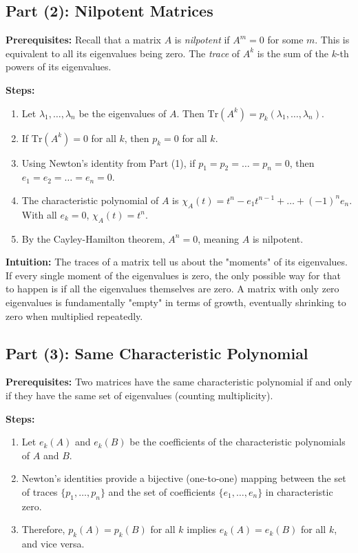 \begin{solution}
\subsection*{Part (2): Nilpotent Matrices}

\textbf{Prerequisites:} 
Recall that a matrix $A$ is \textit{nilpotent} if $A^m = 0$ for some $m$. This is equivalent to all its eigenvalues being zero. The \textit{trace} of $A^k$ is the sum of the $k$-th powers of its eigenvalues.

\textbf{Steps:}
\begin{enumerate}
    \item Let $\lambda_1, \dots, \lambda_n$ be the eigenvalues of $A$. Then $\mathrm{Tr}(A^k) = p_k(\lambda_1, \dots, \lambda_n)$.
    \item If $\mathrm{Tr}(A^k) = 0$ for all $k$, then $p_k = 0$ for all $k$.
    \item Using Newton's identity from Part (1), if $p_1 = p_2 = \dots = p_n = 0$, then $e_1 = e_2 = \dots = e_n = 0$.
    \item The characteristic polynomial of $A$ is $\chi_A(t) = t^n - e_1 t^{n-1} + \dots + (-1)^n e_n$. With all $e_k = 0$, $\chi_A(t) = t^n$.
    \item By the Cayley-Hamilton theorem, $A^n = 0$, meaning $A$ is nilpotent.
\end{enumerate}

\textbf{Intuition:}
The traces of a matrix tell us about the "moments" of its eigenvalues. If every single moment of the eigenvalues is zero, the only possible way for that to happen is if all the eigenvalues themselves are zero. A matrix with only zero eigenvalues is fundamentally "empty" in terms of growth, eventually shrinking to zero when multiplied repeatedly.

\par\vspace{1.5em}

\subsection*{Part (3): Same Characteristic Polynomial}

\textbf{Prerequisites:} 
Two matrices have the same characteristic polynomial if and only if they have the same set of eigenvalues (counting multiplicity).

\textbf{Steps:}
\begin{enumerate}
    \item Let $e_k(A)$ and $e_k(B)$ be the coefficients of the characteristic polynomials of $A$ and $B$.
    \item Newton's identities provide a bijective (one-to-one) mapping between the set of traces $\{p_1, \dots, p_n\}$ and the set of coefficients $\{e_1, \dots, e_n\}$ in characteristic zero.
    \item Therefore, $p_k(A) = p_k(B)$ for all $k$ implies $e_k(A) = e_k(B)$ for all $k$, and vice versa.
\end{enumerate}


\end{solution}
